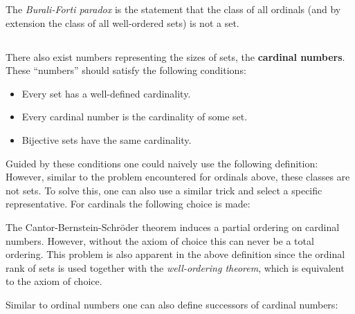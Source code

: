     \begin{remark}
        The \textit{Burali-Forti paradox} is the statement that the class of all ordinals (and by extension the class of all well-ordered sets) is not a set.
    \end{remark}

\subsection{}

    There also exist numbers representing the sizes of sets, the \textbf{cardinal numbers}. These ``numbers'' should satisfy the following conditions:
    \begin{itemize}
        \item Every set has a well-defined cardinality.
        \item Every cardinal number is the cardinality of some set.
        \item Bijective sets have the same cardinality.
    \end{itemize}
    Guided by these conditions one could naively use the following definition:
    However, similar to the problem encountered for ordinals above, these classes are not sets. To solve this, one can also use a similar trick and select a specific representative. For cardinals the following choice is made:

    \begin{remark}[Ordering]
        The Cantor-Bernstein-Schr\"oder theorem induces a partial ordering on cardinal numbers. However, without the axiom of choice this can never be a total ordering. This problem is also apparent in the above definition since the ordinal rank of sets is used together with the \textit{well-ordering theorem}, which is equivalent to the axiom of choice.
    \end{remark}

    Similar to ordinal numbers one can also define successors of cardinal numbers:

